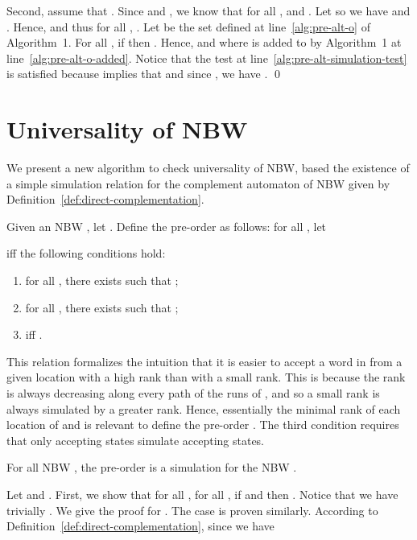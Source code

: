 \documentclass{LMCS}
\begin{document}
Second, assume that . 
Since  and ,
we know that for all ,  and 
. Let  so we have 
  and 
 .
Hence,  and thus for all , .
Let  be the set defined at line~\ref{alg:pre-alt-o} of Algorithm~1.
For all , if  
then . Hence,  and 
 where 
is added to  by Algorithm~1 at line~\ref{alg:pre-alt-o-added}.
Notice that the test at line~\ref{alg:pre-alt-simulation-test} is satisfied because
 implies that  and since ,
we have .
\qed





\section{Universality of NBW}\label{sec:universality}

We present a new algorithm to check universality of NBW, based
the existence of a simple simulation relation for the complement
automaton of NBW given by Definition~\ref{def:direct-complementation}.

\begin{defi}\label{def:simulation-for-KVMH}
Given an NBW ,
let .
Define the pre-order  as follows: 
for all , let 
 
iff the following conditions hold:
  \begin{enumerate}[]
    \item for all , there exists  such that ;
    \item for all , there exists  such that ;
    \item  iff .
  \end{enumerate}
\end{defi}

This relation formalizes the intuition that it is easier to accept a word 
in  from a given location with a high rank than with a small rank. 
This is because the rank is always decreasing along every path of the runs 
of , and so a small rank is always simulated by a greater rank.
Hence, essentially the minimal rank of each location of  and  is relevant
to define the pre-order . The third condition requires
that only accepting states simulate accepting states.



\begin{lem}\label{lem:univ-simulation-relation}
For all NBW , 
the pre-order  is a simulation for the NBW .
\end{lem} 

\proof Let  and 
.
First, we show that for all 
, for all ,
if  
and  
then . Notice that we have trivially 
.
We give the proof for . 
The case  is proven similarly.
According to Definition~\ref{def:direct-complementation}, 
since  we have
\end{document}
